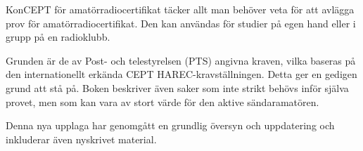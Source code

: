 \newpage
\AddToShipoutPicture*{\BackgroundPicLast}

\color{white}
KonCEPT för amatörradiocertifikat täcker allt man behöver veta för att
avlägga prov för amatörradiocertifikat. Den kan användas för studier
på egen hand eller i grupp på en radioklubb.

Grunden är de av Post- och telestyrelsen (PTS) angivna kraven, vilka baseras på
den internationellt erkända CEPT HAREC-kravställningen. Detta ger en gedigen
grund att stå på. Boken beskriver även saker som inte strikt behövs inför
själva provet, men som kan vara av stort värde för den aktive sändaramatören.

Denna nya upplaga har genomgått en grundlig översyn och uppdatering och inkluderar även nyskrivet material.
